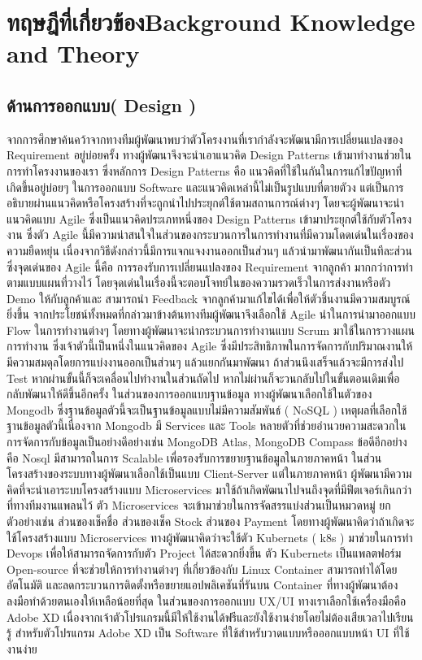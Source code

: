 \chapter{\ifcpe ทฤษฎีที่เกี่ยวข้อง\else Background Knowledge and Theory\fi}


\section{ด้านการออกแบบ( Design )}
จากการศึกษาค้นคว้าจากทางทีมผู้พัฒนาพบว่าตัวโครงงานที่เรากำลังจะพัฒนามีการเปลี่ยนแปลงของ Requirement อยู่บ่อยครั้ง  ทางผู้พัฒนาจึงจะนำเอาแนวคิด Design Patterns เข้ามาทำงานช่วยในการทำโครงงานของเรา 
ซึ่งหลักการ Design Patterns คือ แนวคิดที่ใช้ในกันในการแก้ไขปัญหาที่เกิดขึ้นอยู่บ่อยๆ ในการออกแบบ Software และแนวคิดเหล่านี้ไม่เป็นรูปแบบที่ตายตัวง แต่เป็นการอธิบายผ่านแนวคิดหรือโครงสร้างที่จะถูกนำไปประยุกต์ใช้ตามสถานการณ์ต่างๆ  
โดยจะผู้พัฒนาจะนำแนวคิดแบบ Agile  ซึ่งเป็นแนวคิดประเภทหนึ่งของ Design Patterns เข้ามาประยุกต์ใช้กับตัวโครงงาน   ซึ่งตัว Agile นี้มีความน่าสนใจในส่วนของกระบวนการในการทำงานที่มีความโดดเด่นในเรื่องของความยืดหยุ่น  เนื่องจากวิธีดังกล่าวนี้มีการแจกแจงงานออกเป็นส่วนๆ  แล้วนำมาพัฒนากันเป็นทีละส่วน  
ซึ่งจุดเด่นของ Agile นี้คือ การรองรับการเปลี่ยนแปลงของ Requirement จากลูกค้า มากกว่าการทำตามแบบแผนที่วางไว้  โดยจุดเด่นในเรื่องนี้จะตอบโจทย์ในของความรวดเร็วในการส่งงานหรือตัว Demo ให้กับลูกค้าและ สามารถนำ Feedback จากลูกค้ามาแก้ไขได้เพื่อให้ตัวชิ้นงานมีความสมบูรณ์ยิ่งขึ้น 
 จากประโยชน์ทั้งหมดที่กล่าวมาข้างต้นทางทีมผู้พัฒนาจึงเลือกใช้ Agile นำในการนำมาออกแบบ Flow ในการทำงานต่างๆ  โดยทางผู้พัฒนาจะนำกระบวนการทำงานแบบ Scrum มาใช้ในการวางแผนการทำงาน 
ซึ่งเจ้าตัวนี้เป็นหนึ่งในแนวคิดของ Agile ซึ่งมีประสิทธิภาพในการจัดการกับปริมาณงานให้มีความสมดุลโดยการแบ่งงานออกเป็นส่วนๆ แล้วแยกกันมาพัฒนา  ถ้าส่วนนึงเสร็จแล้วจะมีการส่งไป Test  หากผ่านขั้นนี้ก็จะเคลื่อนไปทำงานในส่วนถัดไป  หากไม่ผ่านก็จะวนกลับไปในขั้นตอนเดิมเพื่อกลับพัฒนาให้ดีขึ้นอีกครั้ง  
ในส่วนของการออกแบบฐานข้อมูล ทางผู้พัฒนาเลือกใช้ในตัวของ Mongodb ซึ่งฐานข้อมูลตัวนี้จะเป็นฐานข้อมูลแบบไม่มีความสัมพันธ์ ( NoSQL ) 
เหตุผลที่เลือกใช้ฐานข้อมูลตัวนี้เนื่องจาก Mongodb มี Services และ Tools หลายตัวที่ช่วยอำนวยความสะดวกในการจัดการกับข้อมูลเป็นอย่างดีอย่างเช่น MongoDB Atlas, MongoDB Compass 
ข้อดีอีกอย่างคือ Nosql มีสามารถในการ Scalable เพื่อรองรับการขยายฐานข้อมูลในภายภาคหน้า  ในส่วนโครงสร้างของระบบทางผู้พัฒนาเลือกใช้เป็นแบบ Client-Server แต่ในภายภาคหน้า  ผู้พัฒนามีความคิดที่จะนำเอาระบบโครงสร้างแบบ Microservices มาใช้ถ้าเกิดพัฒนาไปจนถึงจุดที่มีฟีตเจอร์เกินกว่าที่ทางทีมงานแพลนไว้  
ตัว Microservices จะเข้ามาช่วยในการจัดสรรแบ่งส่วนเป็นหมวดหมู่  ยกตัวอย่างเช่น  ส่วนของเช็คชื่อ  ส่วนของเช็ค Stock  ส่วนของ Payment  โดยทางผู้พัฒนาคิดว่าถ้าเกิดจะใช้โครงสร้างแบบ Microservices ทางผู้พัฒนาคิดว่าจะใช้ตัว Kubernets ( k8s ) มาช่วยในการทำ Devops เพื่อให้สามารถจัดการกับตัว Project ได้สะดวกยิ่งขึ้น 
ตัว Kubernets เป็นแพลตฟอร์ม Open-source ที่จะช่วยให้การทำงานต่างๆ ที่เกี่ยวข้องกับ Linux Container สามารถทำได้โดยอัตโนมัติ และลดกระบวนการติดตั้งหรือขยายแอปพลิเคชันที่รันบน Container ที่ทางผู้พัฒนาต้องลงมือทำด้วยตนเองให้เหลือน้อยที่สุด 
	ในส่วนของการออกแบบ UX/UI ทางเราเลือกใช้เครื่องมือคือ Adobe XD เนื่องจากเจ้าตัวโปรแกรมนี้มีให้ใช้งานได้ฟรีและยังใช้งานง่ายโดยไม่ต้องเสียเวลาไปเรียนรู้ สำหรับตัวโปรแกรม Adobe XD เป็น Software ที่ใช้สำหรับวาดแบบหรือออกแบบหน้า UI ที่ใช้งานง่าย 
  
